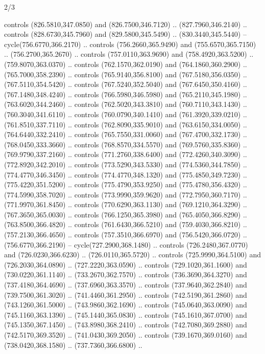 \begin{flagdescription}{2/3}
\begin{scope}[xshift=\flaglength/2,yshift=\flagwidth/2,scale=\flagwidth/341]
\begin{scope}[xshift=-20mm,yshift=38.3mm,scale=0.1565]
\begin{scope}[y=0.80pt, x=0.80pt, yscale=-1, xscale=1,draw=gold,fill=white]
\begin{scope}[line join=round,line cap=round,line width=1.016\lw]
\begin{scope}[fill]
  controls (826.5810,347.0850) and (826.7500,346.7120) .. (827.7960,346.2140) ..
  controls (828.6730,345.7960) and (829.5800,345.5490) .. (830.3440,345.5440) --
  cycle(756.6770,366.2170) .. controls (756.2660,365.9490) and
  (755.6570,365.7150) .. (756.2700,365.2670) .. controls (757.0110,363.9690) and
  (758.4920,363.5200) .. (759.8070,363.0370) .. controls (762.1570,362.0190) and
  (764.1860,360.2900) .. (765.7000,358.2390) .. controls (765.9140,356.8100) and
  (767.5180,356.0350) .. (767.5110,354.5420) .. controls (767.5240,352.5040) and
  (767.6450,350.4160) .. (767.1480,348.4240) .. controls (766.5980,346.5980) and
  (765.2110,345.1980) .. (763.6020,344.2460) .. controls (762.5020,343.3810) and
  (760.7110,343.1430) .. (760.3040,341.6110) .. controls (760.0790,340.1410) and
  (761.3920,339.0210) .. (761.8510,337.7110) .. controls (762.8090,335.9010) and
  (763.6150,334.0050) .. (764.6440,332.2410) .. controls (765.7550,331.0060) and
  (767.4700,332.1730) .. (768.0450,333.3660) .. controls (768.8570,334.5570) and
  (769.5760,335.8360) .. (769.9790,337.2160) .. controls (771.2760,338.6400) and
  (772.4260,340.3090) .. (772.8920,342.2010) .. controls (773.5290,343.5330) and
  (774.5360,344.7850) .. (774.4770,346.3450) .. controls (774.4770,348.1320) and
  (775.4850,349.7230) .. (775.4220,351.5200) .. controls (775.4790,353.9250) and
  (775.4780,356.4320) .. (774.5990,358.7020) .. controls (773.9990,359.9620) and
  (772.7950,360.7170) .. (771.9970,361.8450) .. controls (770.6290,363.1130) and
  (769.1210,364.3290) .. (767.3650,365.0030) .. controls (766.1250,365.3980) and
  (765.4050,366.8290) .. (763.8500,366.4820) .. controls (761.6430,366.5210) and
  (759.4030,366.8210) .. (757.2130,366.4650) .. controls (757.3510,366.6970) and
  (756.5420,366.0720) .. (756.6770,366.2190) -- cycle(727.2900,368.1480) ..
  controls (726.2480,367.0770) and (726.0230,366.6230) .. (726.0110,365.5720) ..
  controls (725.9990,364.5100) and (726.2030,364.0890) .. (727.2220,363.0590) ..
  controls (729.1020,361.1600) and (730.0220,361.1140) .. (733.2670,362.7570) ..
  controls (736.3690,364.3270) and (737.4180,364.4690) .. (737.6960,363.3570) ..
  controls (737.9640,362.2840) and (739.7500,361.3020) .. (741.4460,361.2950) ..
  controls (742.5190,361.2860) and (743.1260,361.5000) .. (743.9860,362.1690) ..
  controls (745.0640,363.0090) and (745.1160,363.1390) .. (745.1440,365.0830) ..
  controls (745.1610,367.0700) and (745.1350,367.1450) .. (743.8980,368.2410) ..
  controls (742.7080,369.2880) and (742.5170,369.3520) .. (741.0430,369.2050) ..
  controls (739.1670,369.0160) and (738.0420,368.1580) .. (737.7360,366.6800) ..

\end{scope}
\end{scope}
\end{scope}
\end{scope}
\end{scope}
\end{flagdescription}
